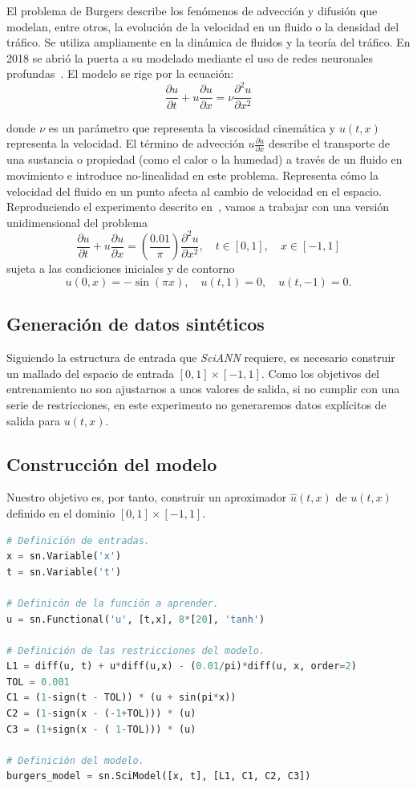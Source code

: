 El problema de Burgers describe los fenómenos de advección y difusión que modelan, entre otros, la evolución de la velocidad en un fluido o la densidad del tráfico. Se utiliza ampliamente en la dinámica de fluidos y la teoría del tráfico. En 2018 se abrió la puerta a su modelado mediante el uso de redes neuronales profundas~\cite{Raissi2018}. El modelo se rige por la ecuación:
\begin{equation}
\frac{\partial u}{\partial t} + u \frac{\partial u}{\partial x} = \nu \frac{\partial^2 u}{\partial x^2}
\end{equation}

donde $\nu$ es un parámetro que representa la viscosidad cinemática y $u(t,x)$ representa la velocidad. El término de advección $u \frac{\partial u}{\partial x}$  describe el transporte de una sustancia o propiedad (como el calor o la humedad) a través de un fluido en movimiento e introduce no-linealidad en este problema. Representa cómo la velocidad del fluido en un punto afecta al cambio de velocidad en el espacio. Reproduciendo el experimento descrito en~\cite{Raissi2018}, vamos a trabajar con una versión unidimensional del problema 
$$
\frac{\partial u}{\partial t} + u \frac{\partial u}{\partial x} = (\frac{0.01}{\pi}) \frac{\partial^2 u}{\partial x^2}, \quad t \in [0, 1],\quad x \in [-1,1]
$$
sujeta a las condiciones iniciales y de contorno
$$
u(0, x) = -\sin(\pi x), \quad u(t, 1) = 0, \quad u(t, -1) = 0.
$$
\subsection{Generación de datos sintéticos}

Siguiendo la estructura de entrada que \textit{SciANN} requiere, es necesario construir un mallado del espacio de entrada $[0,1]\times[-1,1]$. Como los objetivos del entrenamiento no son ajustarnos a unos valores de salida, si no cumplir con una serie de restricciones, en este experimento no generaremos datos explícitos de salida para $u(t,x)$. 

\subsection{Construcción del modelo}
Nuestro objetivo es, por tanto, construir un aproximador 
$\hat{u}(t, x)$ de $u(t,x)$ definido en el dominio $[0,1]\times[-1,1]$.
\begin{lstlisting}[language=Python,caption={Modelo en \textit{SciANN} para el problema de Burgers.},label={lst:exp2}]
# Definición de entradas.
x = sn.Variable('x')
t = sn.Variable('t')

# Definicón de la función a aprender.
u = sn.Functional('u', [t,x], 8*[20], 'tanh')

# Definición de las restricciones del modelo. 
L1 = diff(u, t) + u*diff(u,x) - (0.01/pi)*diff(u, x, order=2)
TOL = 0.001
C1 = (1-sign(t - TOL)) * (u + sin(pi*x))
C2 = (1-sign(x - (-1+TOL))) * (u)
C3 = (1+sign(x - ( 1-TOL))) * (u)

# Definición del modelo.
burgers_model = sn.SciModel([x, t], [L1, C1, C2, C3])
\end{lstlisting}

